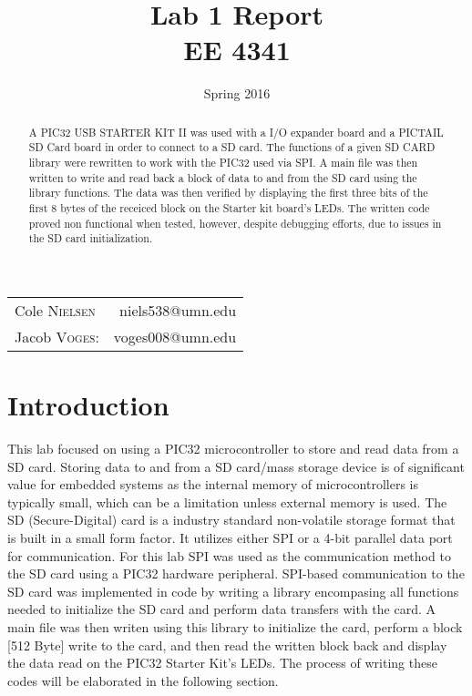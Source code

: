 \documentclass[12pt]{article}
\title{Lab 1 Report\\ \vspace{0.3 in} EE 4341}
\date{Spring 2016}
\begin{document}
\maketitle 
\begin{center}
 \begin{tabular}{l r}
   Cole \textsc{Nielsen} & niels538@umn.edu\\ 
   Jacob \textsc{Voges}: & voges008@umn.edu\\ 
\end{tabular}
\end{center}
\pagebreak
\pagebreak
\begin{abstract}
\noindent A PIC32 USB STARTER KIT II was used with a I/O expander board and a PICTAIL SD Card board in order to connect to a SD card. The functions of a given SD CARD library were rewritten to work with the PIC32 used via SPI. A main file was then written to write and read back a block of data to and from the SD card using the library functions. The data was then verified by displaying the first three bits of the first 8 bytes of the receiced block on the Starter kit board's LEDs. The written code proved non functional when tested, however, despite debugging efforts, due to issues in the SD card initialization.
\end{abstract}
\hrulefill
\section{Introduction}
This lab focused on using a PIC32 microcontroller to store and read data from a SD card. Storing data to and from a SD card/mass storage device is of significant value for embedded systems as the internal memory of microcontrollers is typically small, which can be a limitation unless external memory is used. The SD (Secure-Digital) card is a industry standard non-volatile storage format that is built in a small form factor. It utilizes either SPI or a 4-bit parallel data port for communication. For this lab SPI was used as the communication method to the SD card using a PIC32 hardware peripheral. SPI-based communication to the SD card was implemented in code by writing a library encompasing all functions needed to initialize the SD card and perform data transfers with the card. A main file was then writen using this library to initialize the card, perform a block [512 Byte] write to the card, and then read the written block back and display the data read on the PIC32 Starter Kit's LEDs. The process of writing these codes will be elaborated in the following section.
\end{document}
